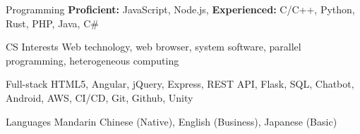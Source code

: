 
\begin{cvskills}
    \cvskill
    {Programming} %
    {\textbf{Proficient:} JavaScript, Node.js, \textbf{Experienced:} C/C++, Python, Rust, PHP, Java, C\#} %
    
    \cvskill
    {CS Interests} %
    {Web technology, web browser, system software, parallel programming, heterogeneous computing} %

      \cvskill
        {Full-stack} %
        {HTML5, Angular, jQuery, Express, REST API, Flask, SQL, Chatbot, Android, AWS, CI/CD, Git, Github, Unity} %

      \cvskill
        {Languages} %
        {Mandarin Chinese (Native), English (Business), Japanese (Basic)} %
    
\end{cvskills}
